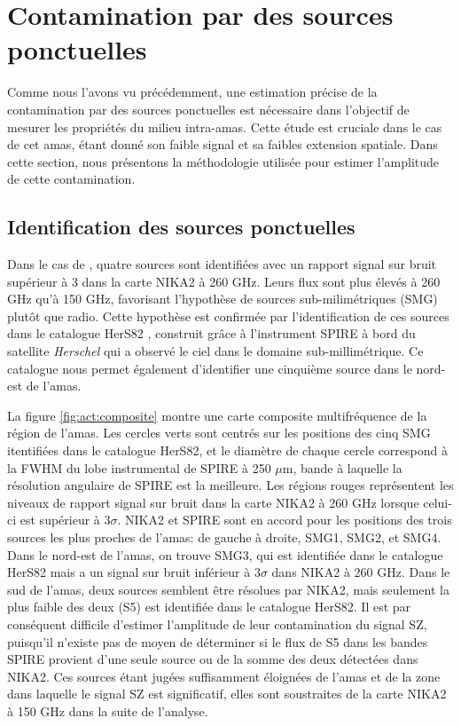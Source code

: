\section{Contamination par des sources ponctuelles}\label{sec:act:ps}

Comme nous l'avons vu précédemment, une estimation précise de la contamination par des sources ponctuelles est nécessaire dans l'objectif de mesurer les propriétés du milieu intra-amas.
Cette étude est cruciale dans le cas de cet amas, étant donné son faible signal et sa faibles extension spatiale.
Dans cette section, nous présentons la méthodologie utilisée pour estimer l'amplitude de cette contamination.

\subsection{Identification des sources ponctuelles}

Dans le cas de \act, quatre sources sont identifiées avec un rapport signal sur bruit supérieur à 3 dans la carte NIKA2 à 260 GHz.
Leurs flux sont plus élevés à 260 GHz qu'à 150 GHz, favorisant l'hypothèse de sources sub-milimétriques (SMG) plutôt que radio.
Cette hypothèse est confirmée par l'identification de ces sources dans le catalogue HerS82 \cite{viero_herschel_2014}, construit grâce à l'instrument SPIRE à bord du satellite \textit{Herschel} qui a observé le ciel dans le domaine sub-millimétrique.
Ce catalogue nous permet également d'identifier une cinquième source dans le nord-est de l'amas.

La figure \ref{fig:act:composite} montre une carte composite multifréquence de la région de l'amas.
Les cercles verts sont centrés sur les positions des cinq SMG itentifiées dans le catalogue HerS82, et le diamètre de chaque cercle correspond à la FWHM du lobe instrumental de SPIRE à 250 $\mu$m, bande à laquelle la résolution angulaire de SPIRE est la meilleure.
Les régions rouges représentent les niveaux de rapport signal sur bruit dans la carte NIKA2 à 260 GHz lorsque celui-ci est supérieur à $3\sigma$.
NIKA2 et SPIRE sont en accord pour les positions des trois sources les plus proches de l'amas: de gauche à droite, SMG1, SMG2, et SMG4.
Dans le nord-est de l'amas, on trouve SMG3, qui est identifiée dans le catalogue HerS82 mais a un signal sur bruit inférieur à $3\sigma$ dans NIKA2 à 260 GHz.
Dans le sud de l'amas, deux sources semblent être résolues par NIKA2, mais seulement la plus faible des deux (S5) est identifiée dans le catalogue HerS82.
Il est par conséquent difficile d'estimer l'amplitude de leur contamination du signal SZ, puisqu'il n'existe pas de moyen de déterminer si le flux de S5 dans les bandes SPIRE provient d'une seule source ou de la somme des deux détectées dans NIKA2.
Ces sources étant jugées suffisamment éloignées de l'amas et de la zone dans laquelle le signal SZ est significatif, elles sont soustraites de la carte NIKA2 à 150 GHz dans la suite de l'analyse.

